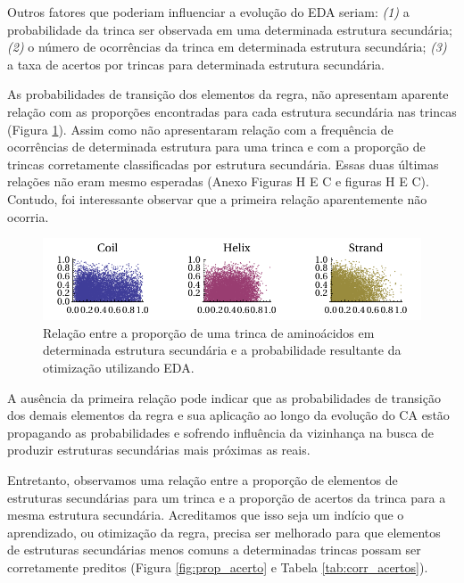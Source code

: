 Outros fatores que poderiam influenciar a evolução do EDA seriam: \textit{(1)} a probabilidade da trinca ser observada em uma determinada estrutura secundária; \textit{(2)} o número de ocorrências da trinca em determinada estrutura secundária; \textit{(3)} a taxa de acertos por trincas para determinada estrutura secundária. 


As probabilidades de transição dos elementos da regra, não apresentam aparente relação com as proporções encontradas para cada estrutura secundária nas trincas (Figura \ref{fig:relacao_prob_propss}). Assim como não apresentaram relação com a frequência de ocorrências de determinada estrutura para uma trinca e com a proporção de trincas corretamente classificadas por estrutura secundária. Essas duas últimas relações não eram mesmo esperadas (Anexo Figuras H E C e figuras H E C). Contudo, foi interessante observar que a primeira relação aparentemente não ocorria. 

\begin{figure}
  \centering
  \includegraphics[width=1\textwidth]{figures/relacao_prob_propss.pdf}
  \caption{Relação entre a proporção de uma trinca de aminoácidos em determinada estrutura secundária e a probabilidade resultante da otimização utilizando EDA.}
        \label{fig:relacao_prob_propss}
\end{figure}

A ausência da primeira relação pode indicar que as probabilidades de transição dos demais elementos da regra e sua aplicação ao longo da evolução do CA estão propagando as probabilidades e sofrendo influência da vizinhança na busca de produzir estruturas secundárias mais próximas as reais. 

Entretanto, observamos uma relação entre a proporção de elementos de estruturas secundárias para um trinca e a proporção de acertos da trinca para a mesma estrutura secundária. Acreditamos que isso seja um indício que o aprendizado, ou otimização da regra, precisa ser melhorado para que elementos de estruturas secundárias menos comuns a determinadas trincas possam ser corretamente preditos (Figura \ref{fig:prop_acerto} e Tabela \ref{tab:corr_acertos}).  

